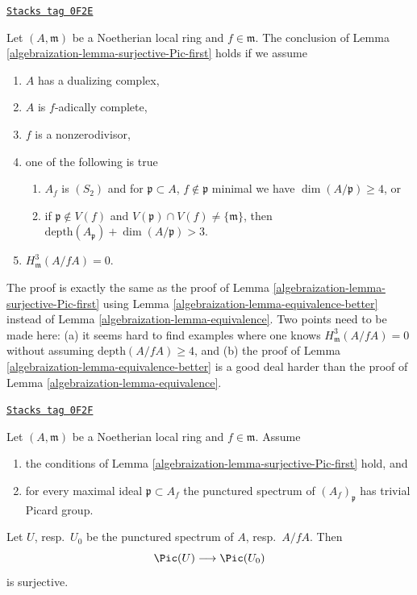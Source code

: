 \begin{remark}
\label{algebraization-remark-surjective-Pic-second}
\href{https://stacks.math.columbia.edu/tag/0F2E}{\texttt{Stacks tag 0F2E}}

Let $(A, \mathfrak m)$ be a Noetherian local ring and $f \in \mathfrak m$.
The conclusion of Lemma \ref{algebraization-lemma-surjective-Pic-first} holds if we assume
\begin{enumerate}
\item $A$ has a dualizing complex,
\item $A$ is $f$-adically complete,
\item $f$ is a nonzerodivisor,
\item one of the following is true
\begin{enumerate}
\item $A_f$ is $(S_2)$ and for $\mathfrak p \subset A$,
$f \not \in \mathfrak p$ minimal we have $\dim(A/\mathfrak p) \geq 4$, or
\item if $\mathfrak p \not \in V(f)$ and
$V(\mathfrak p) \cap V(f) \not = \{\mathfrak m\}$, then
$\text{depth}(A_\mathfrak p) + \dim(A/\mathfrak p) > 3$.
\end{enumerate}
\item $H^3_{\mathfrak m}(A/fA) = 0$.
\end{enumerate}
The proof is exactly the same as the proof of
Lemma \ref{algebraization-lemma-surjective-Pic-first}
using Lemma \ref{algebraization-lemma-equivalence-better} instead of
Lemma \ref{algebraization-lemma-equivalence}.
Two points need to be made here: (a)
it seems hard to find examples where one knows
$H^3_{\mathfrak m}(A/fA) = 0$ without assuming
$\text{depth}(A/fA) \geq 4$, and
(b) the proof of Lemma \ref{algebraization-lemma-equivalence-better} is a
good deal harder than the proof of Lemma \ref{algebraization-lemma-equivalence}.
\end{remark}

\begin{lemma}
\label{algebraization-lemma-surjective-Pic-first-better}
\href{https://stacks.math.columbia.edu/tag/0F2F}{\texttt{Stacks tag 0F2F}}

Let $(A, \mathfrak m)$ be a Noetherian local ring and $f \in \mathfrak m$.
Assume
\begin{enumerate}
\item the conditions of Lemma \ref{algebraization-lemma-surjective-Pic-first} hold, and
\item for every maximal ideal $\mathfrak p \subset A_f$
the punctured spectrum of $(A_f)_\mathfrak p$ has trivial Picard group.
\end{enumerate}
Let $U$, resp.\ $U_0$ be the punctured spectrum of $A$, resp.\ $A/fA$.
Then
$$
\Pic(U) \longrightarrow \Pic(U_0)
$$
is surjective.
\end{lemma}

